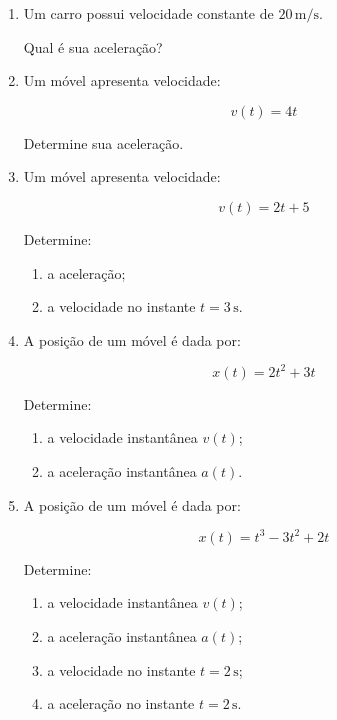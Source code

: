 \documentclass[a4paper,12pt]{article}
\begin{document}
\begin{enumerate}

\item Um carro possui velocidade constante de
$20\,\text{m/s}$.

Qual é sua aceleração?

\vspace{1.5cm}


\item Um móvel apresenta velocidade:

\[
v(t)=4t
\]

Determine sua aceleração.

\vspace{1.5cm}


\item Um móvel apresenta velocidade:

\[
v(t)=2t+5
\]

Determine:

\begin{enumerate}
    \item a aceleração;
    \item a velocidade no instante $t=3\,\text{s}$.
\end{enumerate}

\vspace{1.5cm}


\item A posição de um móvel é dada por:

\[
x(t)=2t^2+3t
\]

Determine:

\begin{enumerate}
    \item a velocidade instantânea $v(t)$;
    \item a aceleração instantânea $a(t)$.
\end{enumerate}

\vspace{1.5cm}


\item A posição de um móvel é dada por:

\[
x(t)=t^3-3t^2+2t
\]

Determine:

\begin{enumerate}
    \item a velocidade instantânea $v(t)$;
    \item a aceleração instantânea $a(t)$;
    \item a velocidade no instante $t=2\,\text{s}$;
    \item a aceleração no instante $t=2\,\text{s}$.
\end{enumerate}

\end{enumerate}
\end{document}
